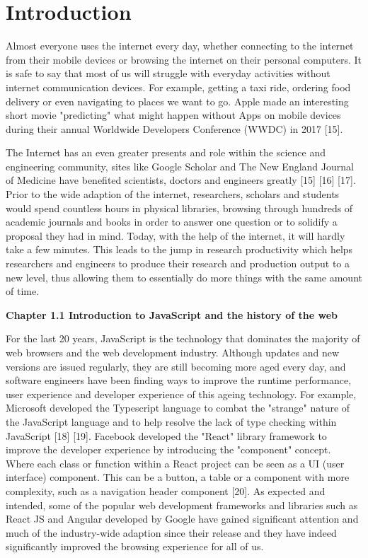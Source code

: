 \chapter{Introduction}

Almost everyone uses the internet every day, whether connecting to the internet from their mobile devices or browsing the internet on their personal computers. It is safe to say that most of us will struggle with everyday activities without internet communication devices. For example, getting a taxi ride, ordering food delivery or even navigating to places we want to go. Apple made an interesting short movie "predicting" what might happen without Apps on mobile devices during their annual Worldwide Developers Conference (WWDC) in 2017 [15].
 
The Internet has an even greater presents and role within the science and engineering community, sites like Google Scholar and The New England Journal of Medicine have benefited scientists, doctors and engineers greatly [15] [16] [17]. Prior to the wide adaption of the internet, researchers, scholars and students would spend countless hours in physical libraries, browsing through hundreds of academic journals and books in order to answer one question or to solidify a proposal they had in mind. Today, with the help of the internet, it will hardly take a few minutes. This leads to the jump in research productivity which helps researchers and engineers to produce their research and production output to a new level, thus allowing them to essentially do more things with the same amount of time.

\bigskip
\bigskip

\textbf{{\Large Chapter 1.1 Introduction to JavaScript and the history of the web}}

\bigskip

For the last 20 years, JavaScript is the technology that dominates the majority of web browsers and the web development industry. Although updates and new versions are issued regularly, they are still becoming more aged every day, and software engineers have been finding ways to improve the runtime performance, user experience and developer experience of this ageing technology. For example, Microsoft developed the Typescript language to combat the "strange" nature of the JavaScript language and to help resolve the lack of type checking within JavaScript [18] [19]. Facebook developed the "React" library framework to improve the developer experience by introducing the "component" concept. Where each class or function within a React project can be seen as a UI (user interface) component. This can be a button, a table or a component with more complexity, such as a navigation header component [20]. As expected and intended, some of the popular web development frameworks and libraries such as React JS and Angular developed by Google have gained significant attention and much of the industry-wide adaption since their release and they have indeed significantly improved the browsing experience for all of us.

